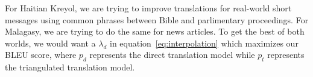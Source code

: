 \documentclass[11pt]{article}
\begin{document}

 For Haitian Kreyol, we are trying to improve translations for real-world short messages using common phrases between Bible and parlimentary proceedings. For Malagasy, we are trying to do the same for news articles. To get the best of both worlds, we would want a $\lambda_{d}$ in equation~\eqref{eq:interpolation} which maximizes our BLEU score, where $p_{d}$ represents the direct translation model while $p_{t}$ represents the triangulated translation model. 
		
\end{document}
